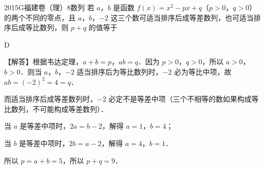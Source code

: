 
\begin{problem}{2015}{G}{福建卷（理）}{8}{数列}
若 $ a $，$ b $ 是函数 $ f(x)=x^{2}-px+q $（$ p>0 $，$ q>0 $）的两个不同的零点，且 $ a $，$ b $，$ -2 $ 这三个数可适当排序后成等差数列，也可适当排序后成等比数列，则 $ p+q $ 的值等于

\begin{choices}
\end{choices}
\end{problem}

\begin{answer}
D
\end{answer}

\begin{solutions}
【解答】根据韦达定理，$ a+b=p $，$ ab=q $．因为 $ p>0 $，$ q>0 $，所以 $ a>0 $，$ b>0 $．则当 $ a $，$ b $，$ -2 $ 适当排序后为等比数列时，$ -2 $ 必为等比中项，故 $ ab=(-2)^{2}=4=q $．

而适当排序后成等差数列时，$ -2 $ 必定不是等差中项（三个不相等的数如果构成等比数列，不可能构成等差数列）．

当 $ a $ 是等差中项时，$ 2a=b-2 $，解得 $ a=1 $，$ b=4 $；

当 $ b $ 是等差中项时，$ 2b=a-2 $，解得 $ a=4 $，$ b=1 $．

所以 $ p=a+b=5 $，所以 $ p+q=9 $．
\end{solutions}